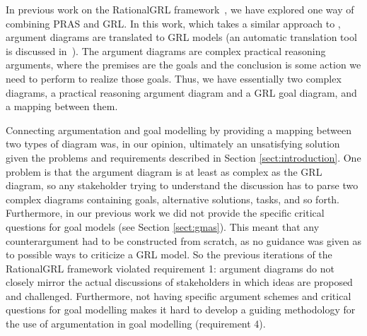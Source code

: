 In previous work on the RationalGRL framework~\cite{vanzee-etal:renext2015,vanZee-etal:er2016}, we have explored one way of combining PRAS and GRL. In this work, which takes a similar approach to \cite{Jureta:RE2008}, argument diagrams are translated to GRL models (an automatic translation tool is discussed in~\cite{vanZee-etal:comma2016}). The argument diagrams are complex practical reasoning arguments, where the premises are the goals and the conclusion is some action we need to perform to realize those goals. Thus, we have essentially two complex diagrams, a practical reasoning argument diagram and a GRL goal diagram, and a mapping between them. 

Connecting argumentation and goal modelling by providing a mapping between two types of diagram was, in our opinion, ultimately an unsatisfying solution given the problems and requirements described in Section \ref{sect:introduction}. One problem is that the argument diagram is at least as complex as the GRL diagram, so any stakeholder trying to understand the discussion has to parse two complex diagrams containing goals, alternative solutions, tasks, and so forth. Furthermore, in our previous work we did not provide the specific critical questions for goal models (see Section \ref{sect:gmas}). This meant that any counterargument had to be constructed from scratch, as no guidance was given as to possible ways to criticize a GRL model. So the previous iterations of the RationalGRL framework violated requirement 1: argument diagrams do not closely mirror the actual discussions of stakeholders in which ideas are proposed and challenged. Furthermore, not having specific argument schemes and critical questions for goal modelling makes it hard to develop a guiding methodology for the use of argumentation in goal modelling (requirement 4). 

